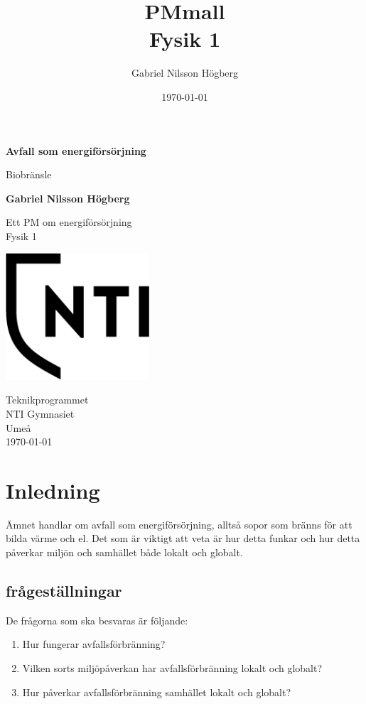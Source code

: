 \documentclass[11p]{article}
\title{PMmall \\ \small Fysik 1}
\author{Gabriel Nilsson Högberg}
\date{\today}
\begin{document}
    \begin{titlepage}
        \begin{center}
            \vspace*{1cm}

            \Huge
            \textbf{Avfall som energiförsörjning}

            \vspace{0.5cm}
            \LARGE
            Biobränsle

            \vspace{1.5cm}

            \textbf{Gabriel Nilsson Högberg}

            \vfill

            Ett PM om energiförsörjning \\
            Fysik 1

            \vspace{0.8cm}

            \includegraphics[width=0.4\textwidth]{../images/NTI Gymnasiet_Symbol_print_svart.png}

            \Large
            Teknikprogrammet\\
            NTI Gymnasiet\\
            Umeå\\
            \today

        \end{center}
    \end{titlepage}
    \tableofcontents
    \newpage

    \section{Inledning}
    Ämnet handlar om avfall som energiförsörjning, alltså sopor som bränns för att bilda värme och el. Det som är viktigt att veta är hur detta funkar och hur detta påverkar miljön och samhället både lokalt och globalt.

    \subsection{frågeställningar}
    De frågorna som ska besvaras är följande:
    \begin{enumerate}
        \item Hur fungerar avfallsförbränning?
        \item Vilken sorts miljöpåverkan har avfallsförbränning lokalt och globalt?
        \item Hur påverkar avfallsförbränning samhället lokalt och globalt?
    \end{enumerate}
\end{document}

